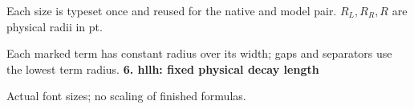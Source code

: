 \documentclass{article}
\newcommand\High{\frac{\displaystyle\sum_{k=1}^n x_k}{1+\frac pq}}
\newcommand\Mark[1]{\directlua{grid.mark(#1)}}
\begin{document}
\par\medskip
Each size is typeset once and reused for the native and model pair. $R_L,R_R,R$ are physical radii in pt.\par
Each marked term has constant radius over its width; gaps and separators use the lowest term radius.
\newpage
{\Large\bfseries 6. hllh: fixed physical decay length}\par\medskip
{} Actual font sizes; no scaling of finished formulas.\par\medskip
\end{document}
